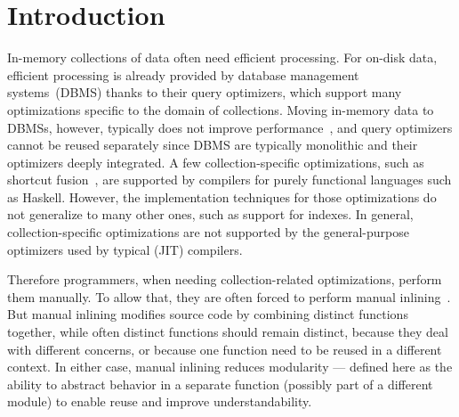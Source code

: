 \section{Introduction}
In-memory collections of data often need efficient processing. For on-disk
data, efficient processing is already provided by database management systems~(DBMS) thanks to
their query optimizers, which support many optimizations specific to the domain
of collections. Moving in-memory data to DBMSs, however,
typically does not improve performance~\citep{Stonebraker07}, and query optimizers cannot
be reused separately since DBMS are typically monolithic and their optimizers deeply integrated.
A few collection-specific optimizations, such as shortcut
fusion~\citep{Gill93shortcut}, are supported by compilers for purely
functional languages such as Haskell. However, the implementation techniques for
those optimizations do not
generalize to many other ones, such as support for indexes. In
general, collection-specific optimizations are not supported by the general-purpose
optimizers used by typical (JIT) compilers.


Therefore programmers, when needing
collection-related optimizations, perform them manually. To allow that, they are often forced to perform manual
inlining~\citep{Peyton-Jones02}.
But manual inlining
modifies source code by combining distinct functions together, while often distinct
functions should remain distinct, because they deal with different concerns, or
because one function need to be reused in a different context.
In either case, manual inlining reduces modularity --- defined here as the
ability to abstract behavior in a separate function (possibly part of a
different module) to enable reuse and improve understandability.%

